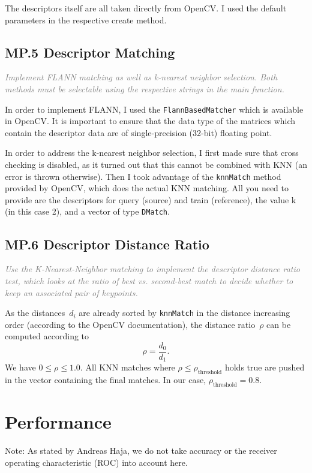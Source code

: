 \documentclass[a4paper]{scrartcl}
\begin{document}
The descriptors itself are all taken directly from OpenCV. I used the default parameters
in the respective create method.

\subsection*{MP.5 Descriptor Matching}
\textcolor{gray}{\textit{Implement FLANN matching as well as k-nearest neighbor selection. Both methods must be selectable using the respective strings in the main function.}}

In order to implement FLANN, I used the \texttt{FlannBasedMatcher} which is available in OpenCV.
It is important to ensure that the data type of the matrices which contain the
descriptor data are of single-precision (32-bit) floating point.

In order to address the k-nearest neighbor selection, I first made sure that cross checking is disabled,
as it turned out that this cannot be combined with KNN (an error is thrown otherwise).
Then I took advantage of the \texttt{knnMatch} method provided by OpenCV, which
does the actual KNN matching.
All you need to provide are the descriptors for query (source) and train (reference),
the value k (in this case 2), and a vector of type \texttt{DMatch}.


\subsection*{MP.6 Descriptor Distance Ratio}
\textcolor{gray}{\textit{Use the K-Nearest-Neighbor matching to implement the descriptor distance ratio test, which looks at the ratio of best vs. second-best match to decide whether to keep an associated pair of keypoints.}}

As the distances~$d_i$ are already sorted by \texttt{knnMatch} in the distance increasing order (according to the
OpenCV documentation), the distance ratio~$\rho$ can be computed according to
\begin{equation}
	\rho = \frac{d_0}{d_1}.
\end{equation}
We have $0 \le \rho \le 1.0$.
All KNN matches where $\rho \le \rho_\text{threshold}$ holds true
are pushed in the vector containing the final matches.
In our case, $\rho_\text{threshold} = 0.8$.

\section*{Performance}
Note: As stated by Andreas Haja,
we do not take accuracy or the receiver operating characteristic (ROC) into account here.
\end{document}
